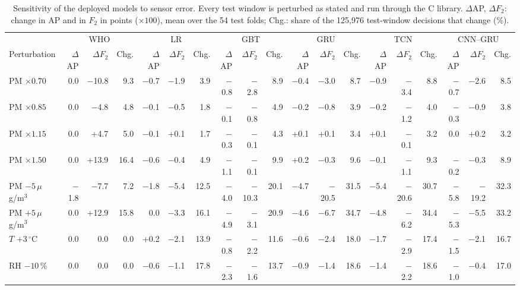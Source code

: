 \begin{table}[t]
\centering
\caption{Sensitivity of the deployed models to sensor error. Every test window is perturbed as stated and run through the C library. $\Delta$AP, $\Delta F_2$: change in AP and in $F_2$ in points ($\times100$), mean over the 54 test folds; Chg.: share of the 125{,}976 test-window decisions that change (\%).}
\label{tab:robust}
\footnotesize
\setlength{\tabcolsep}{3.2pt}
\begin{tabular}{lrrrrrrrrrrrrrrrrrr}
\toprule
 & \multicolumn{3}{c}{WHO} & \multicolumn{3}{c}{LR} & \multicolumn{3}{c}{GBT} & \multicolumn{3}{c}{GRU} & \multicolumn{3}{c}{TCN} & \multicolumn{3}{c}{CNN--GRU} \\
\cmidrule(lr){2-4}\cmidrule(lr){5-7}\cmidrule(lr){8-10}\cmidrule(lr){11-13}\cmidrule(lr){14-16}\cmidrule(lr){17-19}
Perturbation & $\Delta$AP & $\Delta F_2$ & Chg. & $\Delta$AP & $\Delta F_2$ & Chg. & $\Delta$AP & $\Delta F_2$ & Chg. & $\Delta$AP & $\Delta F_2$ & Chg. & $\Delta$AP & $\Delta F_2$ & Chg. & $\Delta$AP & $\Delta F_2$ & Chg. \\
\midrule
PM $\times0.70$ & 0.0 & $-$10.8 & 9.3 & $-$0.7 & $-$1.9 & 3.9 & $-$0.8 & $-$2.8 & 8.9 & $-$0.4 & $-$3.0 & 8.7 & $-$0.9 & $-$3.4 & 8.8 & $-$0.7 & $-$2.6 & 8.5 \\
PM $\times0.85$ & 0.0 & $-$4.8 & 4.8 & $-$0.1 & $-$0.5 & 1.8 & $-$0.1 & $-$0.8 & 4.9 & $-$0.2 & $-$0.8 & 3.9 & $-$0.2 & $-$1.2 & 4.0 & $-$0.3 & $-$0.9 & 3.8 \\
PM $\times1.15$ & 0.0 & +4.7 & 5.0 & $-$0.1 & +0.1 & 1.7 & $-$0.3 & $-$0.1 & 4.3 & +0.1 & +0.1 & 3.4 & +0.1 & $-$0.1 & 3.2 & 0.0 & +0.2 & 3.2 \\
PM $\times1.50$ & 0.0 & +13.9 & 16.4 & $-$0.6 & $-$0.4 & 4.9 & $-$1.1 & $-$0.1 & 9.9 & +0.2 & $-$0.3 & 9.6 & $-$0.1 & $-$1.1 & 9.3 & $-$0.2 & $-$0.3 & 8.9 \\
PM $-5\,\mu$g/m$^3$ & $-$1.8 & $-$7.7 & 7.2 & $-$1.8 & $-$5.4 & 12.5 & $-$4.0 & $-$10.3 & 20.1 & $-$4.7 & $-$20.5 & 31.5 & $-$5.4 & $-$20.6 & 30.7 & $-$5.8 & $-$19.2 & 32.3 \\
PM $+5\,\mu$g/m$^3$ & 0.0 & +12.9 & 15.8 & 0.0 & $-$3.3 & 16.1 & $-$4.9 & $-$3.1 & 20.9 & $-$4.6 & $-$6.7 & 34.7 & $-$4.8 & $-$6.2 & 34.4 & $-$5.3 & $-$5.5 & 33.2 \\
$T$ $+3\,^\circ$C & 0.0 & 0.0 & 0.0 & +0.2 & $-$2.1 & 13.9 & $-$0.8 & $-$2.2 & 11.6 & $-$0.6 & $-$2.4 & 18.0 & $-$1.7 & $-$2.9 & 17.4 & $-$1.5 & $-$2.1 & 16.7 \\
RH $-10$\,\% & 0.0 & 0.0 & 0.0 & $-$0.6 & $-$1.1 & 17.8 & $-$2.3 & $-$1.6 & 13.7 & $-$0.9 & $-$1.4 & 18.6 & $-$1.4 & $-$2.2 & 18.6 & $-$1.0 & $-$0.4 & 17.0 \\
\bottomrule
\end{tabular}
\end{table}

